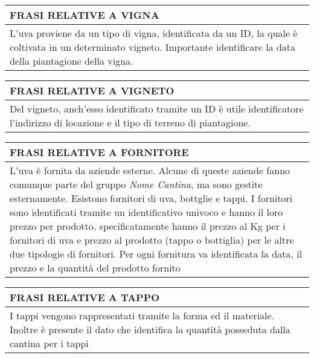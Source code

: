 \begin{center}
	\begin{tabular}{P{16cm}}
		\toprule
		 \textbf {\large {FRASI RELATIVE A VIGNA}} \\
		\midrule
		L'uva proviene da un tipo di vigna, identificata da un ID, la quale è coltivata in un determinato vigneto. Importante identificare la data della piantagione della vigna.\\
		\bottomrule
	\end{tabular}

	\vspace{0.5cm}
	
	\begin{tabular}{P{16cm}}
		\toprule
		 \textbf {\large {FRASI RELATIVE A VIGNETO}} \\
		\midrule
		Del vigneto, anch'esso identificato tramite un ID è utile identificatore l'indirizzo di locazione e il tipo di terreno di piantagione.\\
		\bottomrule
	\end{tabular}
	
	\vspace{0.5cm}
	
	\begin{tabular}{P{16cm}}
		\toprule
		 \textbf {\large {FRASI RELATIVE A FORNITORE}} \\
		\midrule
		L'uva è fornita da aziende esterne. Alcune di queste aziende fanno comunque parte del gruppo \emph{Nome Cantina}, ma sono gestite esternamente. Esistono fornitori di uva, bottglie e tappi.
I fornitori sono identificati tramite un identificativo univoco e hanno il loro prezzo per prodotto, specificatamente hanno il prezzo al Kg per i fornitori di uva e prezzo al prodotto (tappo o bottiglia) per le altre due tipologie di fornitori. Per ogni fornitura va identificata la data, il prezzo e la quantità del prodotto fornito\\
		\bottomrule
	\end{tabular}
	
	\vspace{0.5cm}
	
	\begin{tabular}{P{16cm}}
		\toprule
		 \textbf {\large {FRASI RELATIVE A TAPPO}} \\
		\midrule
		I tappi vengono rappresentati tramite la forma ed il materiale. Inoltre è presente il dato che identifica la quantità posseduta dalla cantina per i tappi\\
		\bottomrule
	\end{tabular}
	

\end{center}

